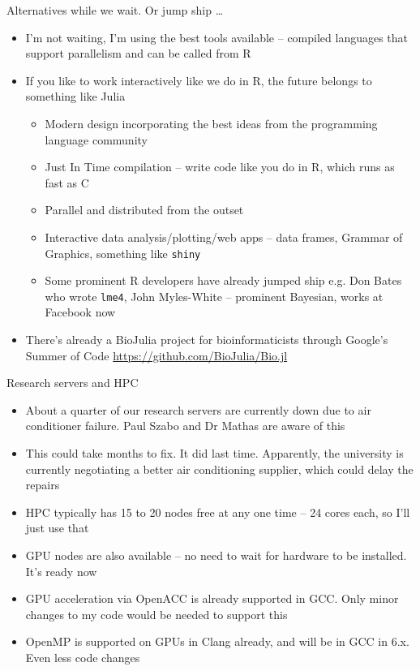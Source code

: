 \documentclass{beamer}
\begin{document}
\begin{frame}{Alternatives while we wait. Or jump ship \ldots}
\begin{itemize}
\item I'm not waiting, I'm using the best tools available -- compiled languages that support parallelism
			and can be called from R
\item If you like to work interactively like we do in R, the future belongs to something like 
			Julia
\begin{itemize}
\item Modern design incorporating the best ideas from the programming language community
\item Just In Time compilation -- write code like you do in R, which runs as fast as C
\item Parallel and distributed from the outset
\item Interactive data analysis/plotting/web apps -- data frames, Grammar of Graphics, something like
			\texttt{shiny}
\item Some prominent R developers have already jumped ship e.g. Don Bates who wrote \texttt{lme4},
			John Myles-White -- prominent Bayesian, works at Facebook now
\end{itemize}
\item There's already a BioJulia project for bioinformaticists through Google's Summer of Code
			\url{https://github.com/BioJulia/Bio.jl}
\end{itemize}
\end{frame}


\begin{frame}{Research servers and HPC}
\begin{itemize}
\item About a quarter of our research servers are currently down due to air conditioner failure.
			Paul Szabo and Dr	Mathas are aware of this
\item This could take months to fix. It did last time. Apparently, the university is currently negotiating
			a better air conditioning supplier, which could delay the repairs
\item HPC typically has 15 to 20 nodes free at any one time -- 24 cores each, so I'll just use that
\item GPU nodes are also available -- no need to wait for hardware to be installed. It's ready now
\item GPU acceleration via OpenACC is already supported in GCC. Only minor changes to my code would be needed 
			to support this
\item OpenMP is supported on GPUs in Clang already, and will be in GCC in 6.x. Even less code changes
\end{itemize}
\end{frame}
\end{document}
